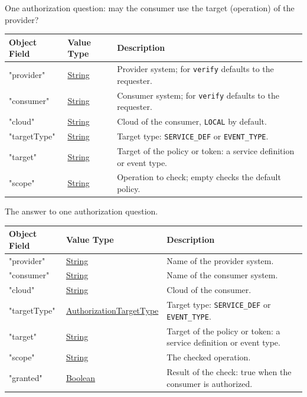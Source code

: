 \documentclass[a4paper]{arrowhead}
\newcommand{\pref}[1]{{\textcolor{ArrowheadGrey}{\hyperref[sec:model:primitives:#1]{#1}}}}
\begin{document}

One authorization question: may the consumer use the target (operation) of the provider?


\noindent\begin{tabularx}{\textwidth}{| >{\raggedright\arraybackslash}p{3.9cm} | >{\raggedright\arraybackslash\small}p{5.3cm} | X |} \hline
\rowcolor{gray!33} Object Field & Value Type & Description \\ \hline
"provider" & \pref{String} & Provider system; for \texttt{verify} defaults to the requester. \\ \hline
"consumer" & \pref{String} & Consumer system; for \texttt{verify} defaults to the requester. \\ \hline
"cloud" & \pref{String} & Cloud of the consumer, \texttt{LOCAL} by default. \\ \hline
"target\allowbreak{}Type" & \pref{String} & Target type: \texttt{SERVICE\_\allowbreak{}DEF} or \texttt{EVENT\_\allowbreak{}TYPE}. \\ \hline
"target" & \pref{String} & Target of the policy or token: a service definition or event type. \\ \hline
"scope" & \pref{String} & Operation to check; empty checks the default policy. \\ \hline
\end{tabularx}




The answer to one authorization question.


\noindent\begin{tabularx}{\textwidth}{| >{\raggedright\arraybackslash}p{3.9cm} | >{\raggedright\arraybackslash\small}p{5.3cm} | X |} \hline
\rowcolor{gray!33} Object Field & Value Type & Description \\ \hline
"provider" & \pref{String} & Name of the provider system. \\ \hline
"consumer" & \pref{String} & Name of the consumer system. \\ \hline
"cloud" & \pref{String} & Cloud of the consumer. \\ \hline
"target\allowbreak{}Type" & \pref{AuthorizationTargetType} & Target type: \texttt{SERVICE\_\allowbreak{}DEF} or \texttt{EVENT\_\allowbreak{}TYPE}. \\ \hline
"target" & \pref{String} & Target of the policy or token: a service definition or event type. \\ \hline
"scope" & \pref{String} & The checked operation. \\ \hline
"granted" & \pref{Boolean} & Result of the check: true when the consumer is authorized. \\ \hline
\end{tabularx}
\end{document}
